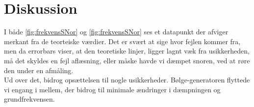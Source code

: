\documentclass[A2_main.tex]{subfiles}
\begin{document}
\section{Diskussion}
I både \cref{fig:frekvensSNor} og \cref{fig:frekvensSNor} ses et datapunkt der afviger merkant fra de teorteiske værdier. Det er svært at sige hvor fejlen kommer fra, men da errorbars viser, at den teoretiske linjer, ligger lagnt væk fra usikkerheden, må det skyldes en fejl aflæsning, eller måske havde vi dæmpet snoren, ved at røre den under en afmåling.
\\ Ud over det, bidrog opsættelsen til nogle usikkerheder. Bølge-generatoren flyttede vi engang i mellem, der bidrog til minimale ændringer i dæmpningen og grundfrekvensen.
\end{document}
